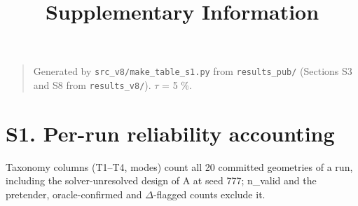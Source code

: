 \documentclass[11pt,a4paper]{article}
\begin{document}
\title{Supplementary Information}

\author{}

\date{}

\maketitle

\begin{quote}
Generated by \texttt{src\_\allowbreak{}v8/\allowbreak{}make\_\allowbreak{}table\_\allowbreak{}s1.\allowbreak{}py} from \texttt{results\_pub/} (Sections S3 and S8 from \texttt{results\_v8/}). \ensuremath{\tau} = 5 \%.
\end{quote}

\section*{S1. Per-run reliability accounting}

Taxonomy columns (T1--T4, modes) count all 20 committed geometries of a run, including the solver-unresolved design of A at seed 777; n\_valid and the pretender, oracle-confirmed and \ensuremath{\Delta}-flagged counts exclude it.
\end{document}
